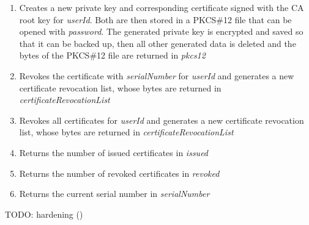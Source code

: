 \documentclass[english]{article}
\begin{document}
\begin{enumerate}
\item Creates a new private key and corresponding certificate signed with the CA root key for \emph{userId}. Both are then stored in a PKCS\#12 file that can be opened with \emph{password}. The generated private key is encrypted and saved so that it can be backed up, then all other generated data is deleted and the bytes of the PKCS\#12 file are returned in \emph{pkcs12}
\item Revokes the certificate with \emph{serialNumber} for \emph{userId} and generates a new certificate revocation list, whose bytes are returned in \emph{certificateRevocationList}
\item Revokes all certificates for \emph{userId} and generates a new certificate revocation list, whose bytes are returned in \emph{certificateRevocationList}
\item Returns the number of issued certificates in \emph{issued}
\item Returns the number of revoked certificates in \emph{revoked}
\item Returns the current serial number in \emph{serialNumber}
\end{enumerate}

TODO: hardening ()
\end{document}
